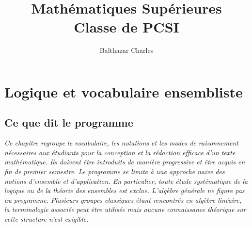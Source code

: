 \documentclass[a4paper, 9pt]{report}
\title{Mathématiques Supérieures\\ Classe de PCSI}
\author{Balthazar Charles}
\begin{document}

\vspace*{-20em}

\chapter{Logique et vocabulaire ensembliste}

\section*{Ce que dit le programme}

\textit{Ce chapitre regroupe le vocabulaire, les notations et les modes de raisonnement nécessaires aux étudiants pour la conception et la rédaction efficace d’un texte mathématique. Ils doivent être introduits de manière progressive et être acquis en fin de premier semestre. Le programme se limite à une approche naïve des notions d’ensemble et d’application. En particulier, toute étude systématique de la logique ou de la théorie des ensembles est exclue. L’algèbre générale ne figure pas au programme. Plusieurs groupes classiques étant rencontrés en algèbre linéaire, la terminologie associée peut être utilisée mais aucune connaissance théorique sur cette structure n’est exigible.}
\end{document}
